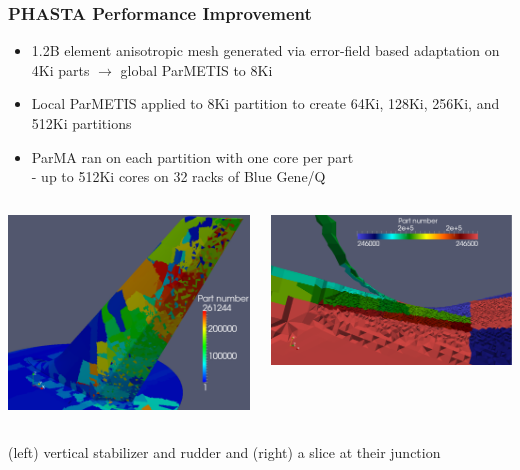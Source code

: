 \documentclass{beamer}
\begin{document}
\begin{frame}
  \frametitle{PHASTA Performance Improvement}
  \begin{itemize}
    \item 1.2B element anisotropic mesh generated via error-field based
      adaptation on 4Ki parts $\rightarrow$ global ParMETIS to 8Ki
    \item Local ParMETIS applied to 8Ki partition to create 64Ki, 128Ki,
      256Ki, and 512Ki partitions 
    \item ParMA ran on each partition with one core per part \\
     - up to 512Ki cores on 32 racks of Blue Gene/Q
 \end{itemize}
  \begin{columns} [t]
    \begin{column}{0.45\textwidth}
      \includegraphics[width=\textwidth]{../parmaimprovement/results/phasta/stabilizerFullView.eps}
    \end{column}
    \begin{column}{0.45\textwidth}
      \centering
      \includegraphics[width=\textwidth]{../parmaimprovement/results/phasta/stabilizerGap.eps}
    \end{column}
  \end{columns}
  \small
  (left) vertical stabilizer and rudder and (right) a slice at their junction
\end{frame}
\end{document}
